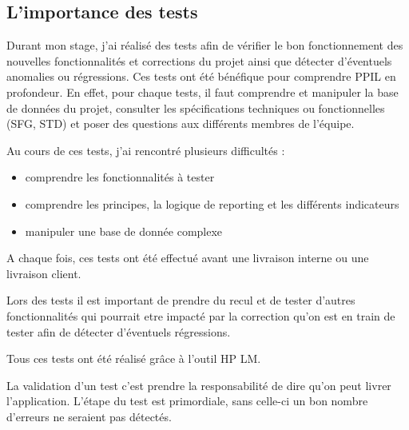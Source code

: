 \subsection{L'importance des tests}

Durant mon stage, j'ai réalisé des tests afin de vérifier le bon fonctionnement des nouvelles fonctionnalités et corrections du projet ainsi que détecter d'éventuels anomalies ou régressions. Ces tests ont été bénéfique pour comprendre PPIL en profondeur. En effet, pour chaque tests, il faut comprendre et manipuler la base de données du projet, consulter les spécifications techniques ou fonctionnelles (SFG, STD) et poser des questions aux différents membres de l'équipe.

Au cours de ces tests, j'ai rencontré plusieurs difficultés : 

\begin{itemize}
    \item comprendre les fonctionnalités à tester
    \item comprendre les principes, la logique de reporting et les différents indicateurs
    \item manipuler une base de donnée complexe
\end{itemize}

A chaque fois, ces tests ont été effectué avant une livraison interne ou une livraison client.

Lors des tests il est important de prendre du recul et de tester d'autres fonctionnalités qui pourrait etre impacté par la correction qu'on est en train de tester afin de détecter d'éventuels régressions.

Tous ces tests ont été réalisé grâce à l'outil HP LM.
        
La validation d'un test c'est prendre la responsabilité de dire qu'on peut livrer l'application. L'étape du test est primordiale, sans celle-ci un bon nombre d'erreurs ne seraient pas détectés.

